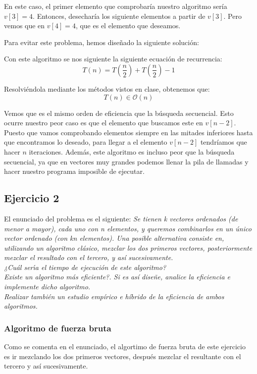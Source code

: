 \documentclass[10pt,a4paper]{article}
\begin{document}
En este caso, el primer elemento que comprobaría nuestro algoritmo sería \(v[3] = 4\). Entonces, desecharía los siguiente elementos a partir de \(v[3]\). Pero vemos que en \(v[4] = 4\), que es el elemento que deseamos. 

Para evitar este problema, hemos diseñado la siguiente solución:



Con este algoritmo se nos siguiente la siguiente ecuación de recurrencia:
\[
	T(n) = T \left( \frac{n}{2} \right) + T \left( \frac{n}{2} \right) - 1
\]

Resolviéndola mediante los métodos vistos en clase, obtenemos que:
\[
	T(n) \in \mathcal{O}(n)
\]

Vemos que es el mismo orden de eficiencia que la búsqueda secuencial. Esto ocurre nuestro peor caso es que el elemento que buscamos este en \(v[n-2]\). Puesto que vamos comprobando elementos siempre en las mitades inferiores hasta que encontramos lo deseado, para llegar a el elemento \(v[n-2]\) tendríamos que hacer \(n\) iteraciones. Además, este algoritmo es incluso peor que la búsqueda secuencial, ya que en vectores muy grandes podemos llenar la pila de llamadas y hacer nuestro programa imposible de ejecutar.

\subsection{Ejercicio 2}
El enunciado del problema es el siguiente: \textit{Se tienen k vectores ordenados (de menor a mayor), cada uno con n elementos, y queremos combinarlos
en un único vector ordenado (con kn elementos). Una posible alternativa consiste en, utilizando un algoritmo clásico, mezclar los dos primeros vectores, posteriormente mezclar el resultado con el tercero, y así sucesivamente.}
\\
\textit{¿Cuál serı́a el tiempo de ejecución de este algoritmo?}
\\
\textit{Existe un algoritmo más eficiente?. Si es así diseñe, analice la eficiencia e implemente dicho algoritmo.}
\\
\textit{Realizar también un estudio empírico e híbrido de la eficiencia de ambos algoritmos.}
\subsubsection{Algoritmo de fuerza bruta}
Como se comenta en el enunciado, el algortimo de fuerza bruta de este ejercicio es ir mezclando los dos primeros vectores, después mezclar el resultante con el tercero y así sucesivamente. \\
\end{document}
